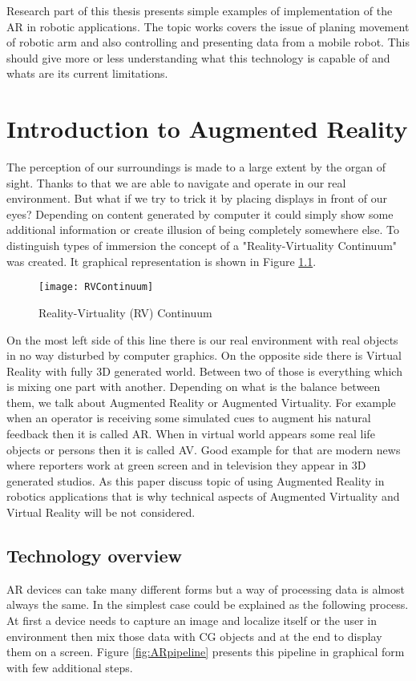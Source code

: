 \documentclass[printmode,en]{mgr}
\begin{document}
Research part of this thesis presents simple examples of implementation of the AR in robotic applications. The topic works covers the issue of planing movement of robotic arm and also controlling and presenting data from a mobile robot. This should give more or less understanding what this technology is capable of and whats are its current limitations.


\chapter{Introduction to Augmented Reality}
The perception of our surroundings is made to a large extent by the organ of sight. Thanks to that we are able to navigate and operate in our real environment. But what if we try to trick it by placing displays in front of our eyes? Depending on content generated by computer it could simply show some additional information or create illusion of being completely somewhere else. To distinguish types of immersion the concept of a "Reality-Virtuality Continuum" \cite{RVContinuum} was created. It graphical representation is shown in Figure \ref{fig:RVContinuum}.

\begin{figure}[!ht]
  \centering
    \texttt{[image: RVContinuum]}
  \caption{Reality-Virtuality (RV) Continuum \cite{RVContinuum}}
  \label{fig:RVContinuum}
\end{figure}

On the most left side of this line there is our real environment with real objects in no way disturbed by computer graphics. On the opposite side there is Virtual Reality with fully 3D generated world. Between two of those is everything which is mixing one part with another. Depending on what is the balance between them, we talk about Augmented Reality or Augmented Virtuality. For example when an operator is receiving some simulated cues to augment his natural feedback then it is called AR. When in virtual world appears some real life objects or persons then it is called AV. Good example for that are modern news where reporters work at green screen and in television they appear in 3D generated studios. As this paper discuss topic of using Augmented Reality in robotics applications that is why technical aspects of Augmented Virtuality and Virtual Reality will be not considered.

\section{Technology overview}
AR devices can take many different forms but a way of processing data is almost always the same. In the simplest case could be explained as the following process. At first a device needs to capture an image and localize itself or the user in environment then mix those data with CG objects and at the end to display them on a screen. Figure \ref{fig:ARpipeline} presents this pipeline in graphical form with few additional steps.
\end{document}
